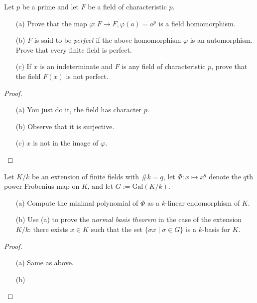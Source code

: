 \begin{prob}[F2013-Q6]
    Let \(p\) be a prime and let \(F\) be a field of characteristic \(p\).
    \begin{itemize}
        \item[(a)] Prove that the map \(\varphi : F \to F, \varphi(a) = a^p\) is a field homomorphism.
        \item[(b)] \(F\) is said to be \textit{perfect} if the above homomorphism \(\varphi\) is an automorphism. Prove that every finite field is perfect.
        \item[(c)] If \(x\) is an indeterminate and \(F\) is any field of characteristic \(p\), prove that the field \(F(x)\) is not perfect.
    \end{itemize}
\end{prob}
\begin{proof}
    \begin{itemize}
        \item[(a)] You just do it, the field has character $p$.
        \item[(b)] Observe that it is surjective.
        \item[(c)] $x$ is not in the image of $\varphi$. 
    \end{itemize}
\end{proof}



\begin{prob}[F2017-Q5]
    Let \(K/k\) be an extension of finite fields with \(\#k=q\), let \(\Phi\colon x\mapsto x^{q}\) denote the \(q\)th power Frobenius map on \(K\), and let \(G:=\text{Gal}(K/k)\).
    \begin{itemize}
        \item[(a)] Compute the minimal polynomial of \(\Phi\) as a \(k\)-linear endomorphism of \(K\).
        \item[(b)] Use (a) to prove the \textit{normal basis theorem} in the case of the extension \(K/k\): there exists \(x\in K\) such that the set \(\{\sigma x\mid\sigma\in G\}\) is a \(k\)-basis for \(K\).
    \end{itemize}
\end{prob}
\begin{proof}
    \begin{itemize}
        \item[(a)] Same as above.
        \item[(b)]   
    \end{itemize}
\end{proof}


